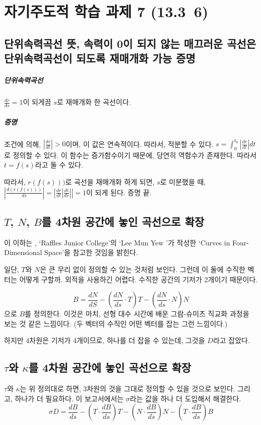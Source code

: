 \chapter{자기주도적 학습 과제 7 (13.3~6)}

\section{단위속력곡선 뜻, 속력이 0이 되지 않는 매끄러운 곡선은 단위속력곡선이 되도록 재매개화 가능 증명}
\paragraph{단위속력곡선}
$\frac{dr}{ds} = 1$이 되게끔 $s$로 재매개화 한 곡선이다. 

\paragraph{증명}
조건에 의해, $\left| \frac{dr}{dt} \right| > 0$이며, 이 값은 연속적이다. 따라서, 적분할 수 있다.
$s = \int_0^{t_0} \left| \frac{dr}{dt} \right|  dt$로 정의할 수 있다. 
이 함수는 증가함수이기 때문에, 당연히 역함수가 존재한다. 따라서 $t = f(s)$라고 둘 수 있다.

따라서, $r(f(s)))$로 곡선을 재매개화 하게 되면, $s$로 미분했을 때, $ \left| \frac{d (r(f(s)))}{ds} \right| = \left|\frac{dr}{dt}\left| \frac{dt}{dr}\right| \right| = 1$이 되게 된다. 증명 끝.


\section{$T$, $N$, $B$를 4차원 공간에 놓인 곡선으로 확장}
이 이하는 , `Raffles Junior College'의 `Lee Mun Yew '가 작성한 `Curves in Four-Dimensional Space'을 참고한 것임을 밝힌다.


일단, $T$와 $N$은 큰 무리 없이 정의할 수 있는 것처럼 보인다. 그런데 이 둘에 수직한 벡터는 어떻게 구할까. 외적을 사용하긴 어렵다. 수직한 공간의 기저가 2개이기 때문이다.

$$B = \frac{dN}{dS} - \left(\frac{dN}{ds} \cdot T\right)T -  \left(\frac{dN}{ds} \cdot N\right)N$$으로 $B$를 정의한다. 
이것은 마치, 선형 대수 시간에 배운 그람-슈미츠 직교화 과정을 보는 것 같은 느낌이다. (두 벡터의 수직인 어떤 벡터를 잡는 그런 느낌이다.)

하지만 4차원은 기저가 4개이므로, 하나를 더 잡을 수 있는데, 그것을 $D$라고 잡았다.

\section{$\tau$와 $\kappa$를 4차원 공간에 놓인 곡선으로 확장}
$\tau$와 $\kappa$는 위 정의대로 하면, 3차원의 것을 그대로 정의할 수 있을 것으로 보인다. 그리고, 하나가 더 필요하다.
이 보고서에서는 $\sigma$라는 값을 하나 더 도입해서 해결한다.
$$\sigma D = \frac{dB}{ds} - \left(T \cdot \frac{dB}{ds}\right)T - \left(N \cdot \frac{dB}{ds}\right)N - \left(T \cdot \frac{dB}{ds}\right)B $$


